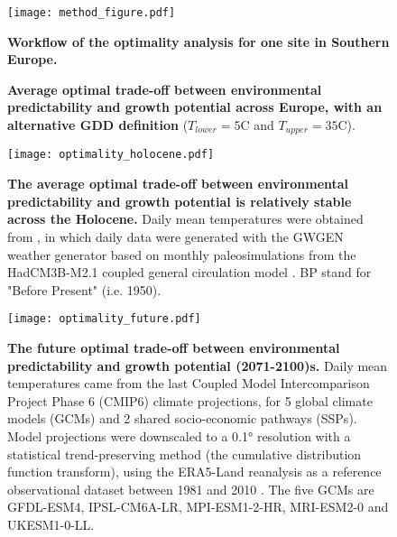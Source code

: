\documentclass[11pt,letter]{article}
\begin{document}
\begin{figure}[hb]
\hspace*{-1.4cm}
\texttt{[image: method\_figure.pdf]}
\vspace*{-0.4cm}
\caption{\textbf{Workflow of the optimality analysis for one site in Southern Europe.}}
\label{fig:method}
\end{figure}

\clearpage

\begin{figure}[h]
\hspace*{-1.2cm}
\vspace*{-0.4cm}
\caption{\textbf{Average optimal trade-off between environmental predictability and growth potential across Europe, with an alternative GDD definition} ($T_{lower}=5$\degree C and $T_{upper}=35$\degree C).}
\label{fig:holocene}
\end{figure}

\begin{figure}[h]
\hspace*{-1.2cm}
\texttt{[image: optimality\_holocene.pdf]}
\vspace*{-1cm}
\caption{\textbf{The average optimal trade-off between environmental predictability and growth potential is relatively stable across the Holocene.} Daily mean temperatures were obtained from \citet{VanderMeersch2024}, in which daily data were generated with the GWGEN weather generator \citep{Sommer2017} based on monthly paleosimulations from the HadCM3B-M2.1 coupled general circulation model \citep{Armstrong2019}. BP stand for "Before Present" (i.e. 1950).}
\label{fig:holocene}
\end{figure}

\begin{figure}[h]
\centering
\texttt{[image: optimality\_future.pdf]}
\vspace*{-0.5cm}
\caption{\textbf{The future optimal trade-off between environmental predictability and growth potential (2071-2100)s.} Daily mean temperatures came from the last Coupled Model Intercomparison Project Phase 6 (CMIP6) climate  projections, for 5 global climate models (GCMs) and 2 shared socio-economic pathways (SSPs). Model projections were downscaled to a 0.1° resolution with a statistical trend-preserving method (the cumulative distribution function transform), using the ERA5-Land reanalysis as a reference observational dataset between 1981 and 2010 \citep{Noel2022}. The five GCMs are GFDL-ESM4, IPSL-CM6A-LR, MPI-ESM1-2-HR, MRI-ESM2-0 and UKESM1-0-LL.}
\label{fig:future}
\vspace*{-10cm}
\end{figure}


\clearpage
\vspace*{1cm}

\end{document}
